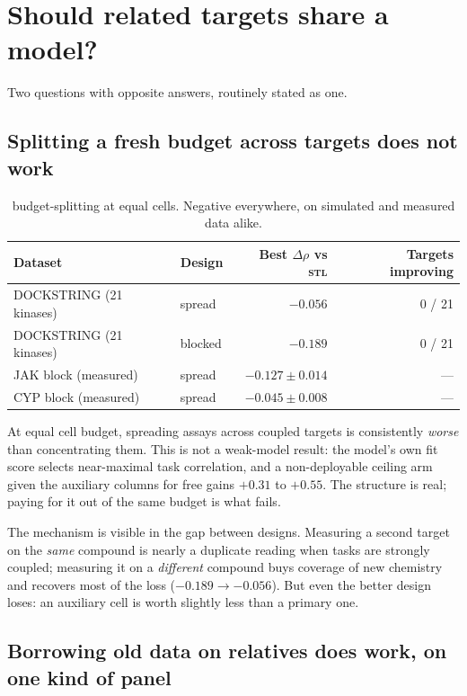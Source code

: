 \documentclass[11pt]{article}
\newcommand{\stl}{\textsc{stl}}
\begin{document}
\section{Should related targets share a model?}
\label{sec:joint}

Two questions with opposite answers, routinely stated as one.

\subsection{Splitting a fresh budget across targets does not work}

\begin{table}[ht]
\centering\small
\begin{tabular}{llrr}
\toprule
Dataset & Design & Best $\Delta\rho$ vs \stl{} & Targets improving \\
\midrule
DOCKSTRING (21 kinases) & spread  & $-0.056$ & 0 / 21 \\
DOCKSTRING (21 kinases) & blocked & $-0.189$ & 0 / 21 \\
JAK block (measured)    & spread  & $-0.127 \pm 0.014$ & --- \\
CYP block (measured)    & spread  & $-0.045 \pm 0.008$ & --- \\
\bottomrule
\end{tabular}
\caption{budget-splitting at equal cells. Negative everywhere, on simulated and measured
data alike.}
\label{tab:h1split}
\end{table}

At equal cell budget, spreading assays across coupled targets is consistently
\emph{worse} than concentrating them. This is not a weak-model result: the
model's own fit score selects near-maximal task correlation, and a non-deployable
ceiling arm given the auxiliary columns for free gains $+0.31$ to $+0.55$. The
structure is real; paying for it out of the same budget is what fails.

The mechanism is visible in the gap between designs. Measuring a second target
on the \emph{same} compound is nearly a duplicate reading when tasks are
strongly coupled; measuring it on a \emph{different} compound buys coverage of
new chemistry and recovers most of the loss ($-0.189 \to -0.056$). But even the
better design loses: an auxiliary cell is worth slightly less than a primary
one.

\subsection{Borrowing old data on relatives does work, on one kind of panel}
\end{document}
